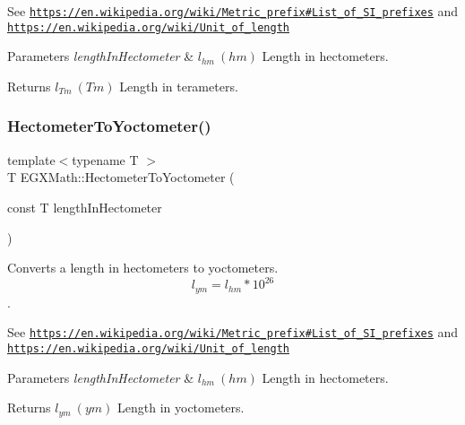 See \href{https://en.wikipedia.org/wiki/Metric_prefix#List_of_SI_prefixes}{\tt https\+://en.\+wikipedia.\+org/wiki/\+Metric\+\_\+prefix\#\+List\+\_\+of\+\_\+\+S\+I\+\_\+prefixes} and \href{https://en.wikipedia.org/wiki/Unit_of_length}{\tt https\+://en.\+wikipedia.\+org/wiki/\+Unit\+\_\+of\+\_\+length} 
\begin{DoxyParams}{Parameters}
{\em length\+In\+Hectometer} & $ l_{hm}\ (hm)$ Length in hectometers. \\
\hline
\end{DoxyParams}
\begin{DoxyReturn}{Returns}
$ l_{Tm}\ (Tm)$ Length in terameters. 
\end{DoxyReturn}
\mbox{\label{group___e_g_x_math-_conversions-_length_conversions-_hectometer-_s_i_ga64c07f341a87b8ebd6a7c10129e3a924}} 
\subsubsection{\texorpdfstring{Hectometer\+To\+Yoctometer()}{HectometerToYoctometer()}}
{\footnotesize\ttfamily template$<$typename T $>$ \\
T E\+G\+X\+Math\+::\+Hectometer\+To\+Yoctometer (\begin{DoxyParamCaption}\item[{const T}]{length\+In\+Hectometer }\end{DoxyParamCaption})}



Converts a length in hectometers to yoctometers. \[ l_{ym}=l_{hm} * 10^{26} \]. 

See \href{https://en.wikipedia.org/wiki/Metric_prefix#List_of_SI_prefixes}{\tt https\+://en.\+wikipedia.\+org/wiki/\+Metric\+\_\+prefix\#\+List\+\_\+of\+\_\+\+S\+I\+\_\+prefixes} and \href{https://en.wikipedia.org/wiki/Unit_of_length}{\tt https\+://en.\+wikipedia.\+org/wiki/\+Unit\+\_\+of\+\_\+length} 
\begin{DoxyParams}{Parameters}
{\em length\+In\+Hectometer} & $ l_{hm}\ (hm)$ Length in hectometers. \\
\hline
\end{DoxyParams}
\begin{DoxyReturn}{Returns}
$ l_{ym}\ (ym)$ Length in yoctometers. 
\end{DoxyReturn}
\mbox{\label{group___e_g_x_math-_conversions-_length_conversions-_hectometer-_s_i_ga6e5db7fe650b044f73f505673d7e484d}} 
